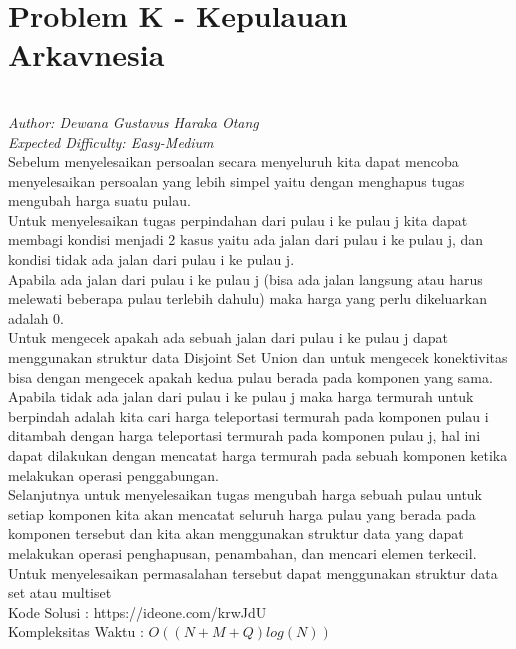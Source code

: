 \section*{Problem K - Kepulauan Arkavnesia}
\\
\textit{Author: Dewana Gustavus Haraka Otang}
\\
\textit{Expected Difficulty: Easy-Medium}
\\

Sebelum menyelesaikan persoalan secara menyeluruh kita dapat mencoba menyelesaikan persoalan yang lebih simpel yaitu dengan menghapus tugas mengubah harga suatu pulau.\\

Untuk menyelesaikan tugas perpindahan dari pulau i ke pulau j kita dapat membagi kondisi menjadi 2 kasus yaitu ada jalan dari pulau i ke pulau j, dan kondisi tidak ada jalan dari pulau i ke pulau j.\\

Apabila ada jalan dari pulau i ke pulau j (bisa ada jalan langsung atau harus melewati beberapa pulau terlebih dahulu) maka harga yang perlu dikeluarkan adalah 0.\\

Untuk mengecek apakah ada sebuah jalan dari pulau i ke pulau j dapat menggunakan struktur data Disjoint Set Union dan untuk mengecek konektivitas bisa dengan mengecek apakah kedua pulau berada pada komponen yang sama.\\

Apabila tidak ada jalan dari pulau i ke pulau j maka harga termurah untuk berpindah adalah kita cari harga teleportasi termurah pada komponen pulau i ditambah dengan harga teleportasi termurah pada komponen pulau j, hal ini dapat dilakukan dengan mencatat harga termurah pada sebuah komponen ketika melakukan operasi penggabungan.\\

Selanjutnya untuk menyelesaikan tugas mengubah harga sebuah pulau untuk setiap komponen kita akan mencatat seluruh harga pulau yang berada pada komponen tersebut dan kita akan menggunakan struktur data yang dapat melakukan operasi penghapusan, penambahan, dan mencari elemen terkecil. Untuk menyelesaikan permasalahan tersebut dapat menggunakan struktur data set atau multiset\\

Kode Solusi : https://ideone.com/krwJdU\\
Kompleksitas Waktu : $O((N + M + Q)log(N))$